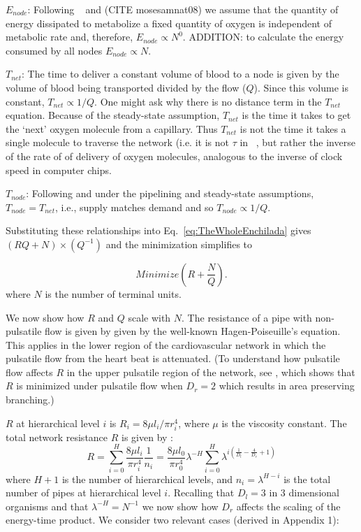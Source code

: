 \documentclass[12pt]{article}
\begin{document}
$E_{node}$: Following ~\cite{west97} and (CITE mosesamnat08) we assume that the quantity of energy dissipated to metabolize a fixed 
quantity of oxygen is independent of metabolic rate and, therefore, 
$E_{node} \propto N^0$.   ADDITION: to calculate the energy consumed by all nodes $E_{node} \propto N$.


$T_{net}$: The time to deliver a constant volume
of blood  to a node is given by the volume of blood being transported divided by the 
flow ($Q$).  Since this volume is constant, $T_{net}\propto 
1/Q$.  %
One might ask why there is no distance term in the $T_{net}$
equation.  Because of the steady-state assumption, $T_{net}$ is the time it
takes to get the `next' oxygen molecule from a capillary. Thus $T_{net}$ is not the time it
takes a single molecule to traverse the network (i.e. it is not $\tau$ in ~\cite{banavar10}, but rather the inverse of the rate of of delivery of oxygen molecules, analogous to the inverse of clock speed in computer chips.


$T_{node}$: Following \cite{banavar10} and under the pipelining and steady-state assumptions, $T_{node}= T_{net}$, i.e., supply matches demand
and so $T_{node} \propto 1/Q$.

Substituting these relationships into Eq.~\ref{eq:TheWholeEnchilada}
 gives  $(RQ + N) \times (Q^{-1})$ and the minimization simplifies to

\begin{equation}
 Minimize (R + \frac{N}{Q}).
\label{eq:bio-min}
\end{equation}
\noindent where $N$ is the number of terminal units.  


We now show how $R$ and $Q$ scale with $N$. The resistance of a pipe with non-pulsatile flow is given by given by the
well-known Hagen-Poiseuille's equation. This applies in the lower region of the cardiovascular network in which the pulsatile flow from the heart beat is attenuated. (To understand how pulsatile flow affects $R$ in the upper pulsatile region of the network, see \cite{west97}, which shows that $R$ is minimized under pulsatile flow when $D_r
  = 2$ which results in area preserving branching.)
  

$R$
at hierarchical level $i$ is $R_i = 8\mu l_i/\pi r_i^4$, where $\mu$ is 
the viscosity constant.  The total network resistance $R$ is given by 
\cite{west97}:
\begin{equation}
\label{eq:resistance}
R = \sum_{i=0}^H \frac{8\mu l_i}{\pi r_i^4}\frac{1}{n_i}
= \frac{8\mu l_0}{\pi r_0^4} \lambda^{-H}\sum_{i=0}^H \lambda^{i 
\left(\frac{1}{D_l} - \frac{4}{D_r} + 1 \right)}
\end{equation}
where $H+1$ is the number of hierarchical levels, and $n_i =
\lambda^{H-i}$ is the total number of pipes at hierarchical level $i$.  Recalling that $D_l = 3$ in 3 dimensional organisms and that $\lambda^{-H} = N^{-1}$ we now show how $D_r$  affects the scaling of the energy-time product. We consider two relevant cases (derived in Appendix 1): 
\end{document}
